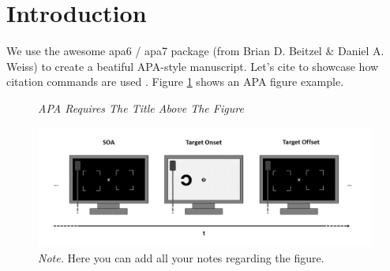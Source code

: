 \section{Introduction}

We use the awesome apa6 / apa7 package (from Brian D. Beitzel \& Daniel A. Weiss) to create a beatiful APA-style manuscript. Let's cite \textcite{Michel2021} to showcase how citation commands are used \parencite[also works in parentheses, see][]{Michel2021}. Figure \ref{fig:fig1} shows an APA figure example.


\begin{figure}[!ht]
    \centering
    \caption{}
    \label{fig:fig1}
    \caption*{\textit{APA Requires The Title Above The Figure}}
    \vspace*{8mm}
    \includegraphics[width=1\textwidth]{../figures/Fig1}
    \caption*{\textit{Note.} Here you can add all your notes regarding the figure.}
\end{figure}
